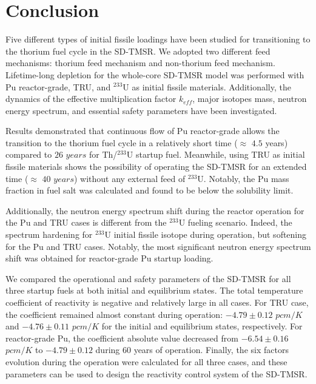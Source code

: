 \section{Conclusion} \label{Conclusion}

Five different types of initial fissile loadings have been studied for 
transitioning to the thorium fuel cycle in the \gls{SD-TMSR}. We 
adopted two different feed mechanisms: thorium feed mechanism and non-thorium 
feed mechanism. Lifetime-long depletion for the whole-core SD-TMSR model was 
performed with Pu reactor-grade, TRU, and $^{233}$U as initial fissile 
materials. Additionally, the dynamics of the effective multiplication factor 
$k_{eff}$, major isotopes mass, neutron energy spectrum, and essential safety 
parameters have been investigated. 

Results demonstrated that continuous flow of Pu reactor-grade allows the 
transition to the thorium fuel cycle in a relatively short time ($\approx$ 
$4.5$ years) compared to $26$ $years$ for Th/$^{233}$U startup fuel. 
Meanwhile, using \gls{TRU} as initial fissile materials shows the possibility 
of operating the SD-TMSR for an extended time ($\approx$ $40$ $years$) 
without any external feed of $^{233}$U. Notably, the Pu mass fraction in 
fuel salt was calculated and found to be below the solubility limit. 

Additionally, the neutron energy spectrum shift during the reactor operation 
for the Pu and TRU cases is different from the $^{233}$U fueling scenario. 
Indeed, the spectrum hardening for $^{233}$U initial fissile isotope during 
operation, but softening for the Pu and TRU cases. Notably, the most 
significant neutron energy spectrum shift was obtained for reactor-grade Pu 
startup loading. 

We compared the operational and safety parameters of the \gls{SD-TMSR} for all 
three startup fuels at both initial and equilibrium states. The total 
temperature coefficient of reactivity is negative and relatively large in all 
cases. For TRU case, the coefficient remained almost constant during 
operation: $-4.79\pm0.12$ $pcm/K$ and $-4.76\pm0.11$ $pcm/K$ for the initial 
and equilibrium states, respectively. For reactor-grade Pu, the coefficient 
absolute value decreased from $-6.54\pm0.16$ $pcm/K$ to $-4.79\pm0.12$ during 
60 years of operation. Finally, the six factors evolution during the operation 
were calculated for all three cases, and these parameters can be used to 
design the reactivity control system of the \gls{SD-TMSR}.

